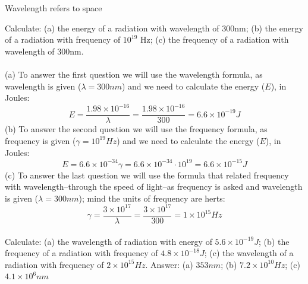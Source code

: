 \documentclass[main.tex]{subfiles}
\begin{document}
\begin{description}
   
      \begin{marginfigure}[0cm]
      \caption{Wavelength refers to space}
   \end{marginfigure}
   
   
   
   
\begin{example} %
Calculate: (a) the energy of a radiation with wavelength of 300nm; (b) the energy of a radiation with frequency of $10^{19}$ Hz; (c) the frequency of a radiation with wavelength of 300nm.\\
\\
(a) To answer the first question we will use the wavelength formula, as wavelength is given ($\lambda=300nm$) and we need to calculate the energy ($E$), in Joules:
\begin{equation*}
E=\frac{1.98\times 10^{-16}}{\lambda}=\frac{1.98\times 10^{-16}}{300}=6.6\times 10^{-19}J
\end{equation*}
(b) To answer the second question we will use the frequency formula, as frequency is given ($\gamma=10^{19}Hz$) and we need to calculate the energy ($E$), in Joules:
\begin{equation*}
E=6.6\times 10^{-34}\gamma=6.6\times 10^{-34}\cdot 10^{19}=6.6\times 10^{-15}J
\end{equation*}
(c) To answer the last question we will use the formula that related frequency with wavelength--through the speed of light--as frequency is asked and wavelength is given ($\lambda=300nm$); mind the units of frequency are herts:
\begin{equation*}
\gamma=\frac{3\times 10^{17}}{\lambda}=  \frac{3\times 10^{17}}{300}=1\times 10^{15}Hz
\end{equation*}
\faDiamond\ \\
Calculate: (a) the wavelength of radiation with energy of $5.6\times 10^{-19}J$; (b) the frequency of a radiation with frequency of $4.8\times 10^{-18}J$; (c) the wavelength of a radiation with frequency of $2\times 10^{15}Hz$.
\flushright Answer: (a) $353nm$; (b) $7.2\times 10^{10}Hz$; (c) $4.1\times 10^{6}nm$
\end{example}%


\end{description}
\end{document}
